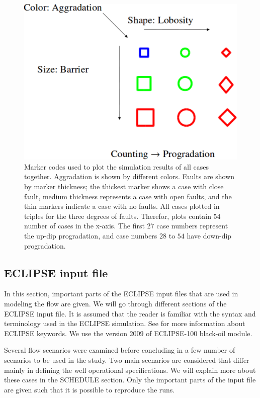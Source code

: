 \begin{figure}
  \centering
  \includegraphics[width=0.65 \linewidth]{./figurer/codes} 
  \caption{Marker codes used to plot the simulation results of all cases
together. Aggradation is shown by different colors. Faults are shown by marker thickness; the thickest marker shows a case with close fault, medium thickness represents a case with open faults, and the thin markers indicate a case with no faults. All cases plotted in triples for the three degrees of faults. Therefor, plots contain 54 number of cases in the x-axis. The first 27 case numbers represent the up-dip progradation, and case numbers $28$ to $54$ have down-dip progradation.}
  \label{fig:codes}
%
\end{figure}


\subsection{ECLIPSE input file}
\label{eclDataFile}

In this section, important parts of the ECLIPSE input files that are used in modeling the flow are given. We will go through different sections of the ECLIPSE input file. It is assumed that the reader is familiar with the syntax and terminology used in the ECLIPSE simulation. See \cite{sis2007eclipse} for more information about ECLIPSE keywords. We use the version 2009 of ECLIPSE-100 black-oil module.

Several flow scenarios were examined before concluding in a few number of scenarios to be used in the study. Two main scenarios are considered that differ mainly in defining the well operational specifications. We will explain more about these cases in the SCHEDULE section. Only the important parts of the input file are given such that it is possible to reproduce the runs.

